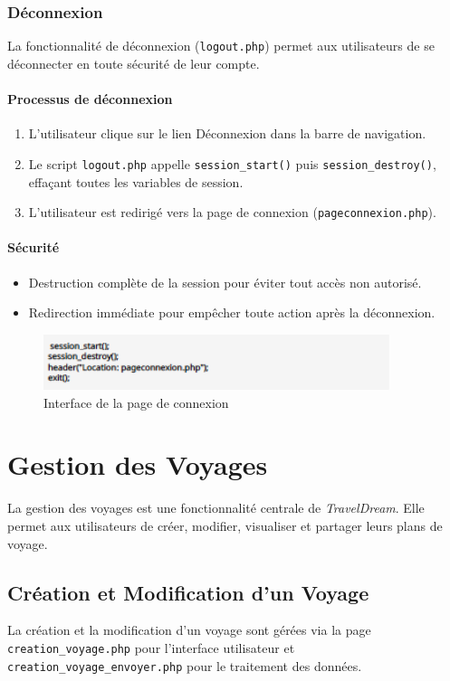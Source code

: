 \documentclass[a4paper,12pt]{article}
\begin{document}
\subsubsection{Déconnexion}
La fonctionnalité de déconnexion (\texttt{logout.php}) permet aux utilisateurs de se déconnecter en toute sécurité de leur compte.
\paragraph{Processus de déconnexion}
\begin{enumerate}
  \item L'utilisateur clique sur le lien \og Déconnexion \fg{} dans la barre de navigation.
  \item Le script \texttt{logout.php} appelle \texttt{session\_start()} puis \texttt{session\_destroy()}, effaçant toutes les variables de session.
  \item L'utilisateur est redirigé vers la page de connexion (\texttt{pageconnexion.php}).
\end{enumerate}

\paragraph{Sécurité}
\begin{itemize}
  \item Destruction complète de la session pour éviter tout accès non autorisé.
  \item Redirection immédiate pour empêcher toute action après la déconnexion.
\end{itemize}
\begin{figure}[H]
  \centering
  \includegraphics[width=0.9\textwidth]{capture5.png}
  \caption{Interface de la page de connexion}
\end{figure}

\section{Gestion des Voyages}
La gestion des voyages est une fonctionnalité centrale de \textit{TravelDream}. Elle permet aux utilisateurs de créer, modifier, visualiser et partager leurs plans de voyage.

\subsection{Création et Modification d'un Voyage}
La création et la modification d'un voyage sont gérées via la page \texttt{creation\_voyage.php} pour l'interface utilisateur et \texttt{creation\_voyage\_envoyer.php} pour le traitement des données.
\end{document}
